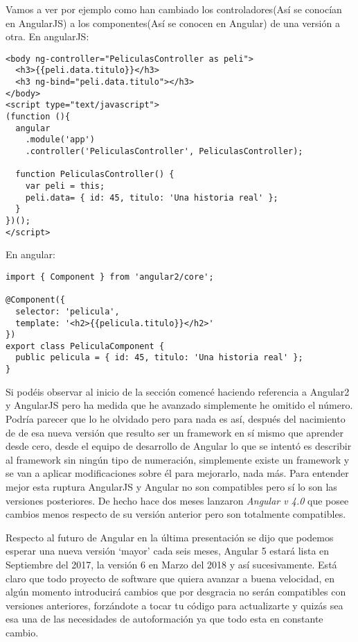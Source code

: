  Vamos a ver por ejemplo como han cambiado los controladores(Así se conocían en AngularJS) a los componentes(Así se conocen en Angular) de una versión a otra.
 En angularJS:
 
 \lstset{breaklines=true, basicstyle=\footnotesize}
\begin{lstlisting}[frame=single]
<body ng-controller="PeliculasController as peli">  
  <h3>{{peli.data.titulo}}</h3>
  <h3 ng-bind="peli.data.titulo"></h3>
</body>  
<script type="text/javascript">  
(function (){
  angular
    .module('app')
    .controller('PeliculasController', PeliculasController);
 
  function PeliculasController() {
    var peli = this;
    peli.data= { id: 45, titulo: 'Una historia real' };
  }
})();
</script> 
\end{lstlisting}

En angular:
 \lstset{breaklines=true, basicstyle=\footnotesize}
\begin{lstlisting}[frame=single]
import { Component } from 'angular2/core';
 
@Component({
  selector: 'pelicula',
  template: '<h2>{{pelicula.titulo}}</h2>'
})
export class PeliculaComponent {  
  public pelicula = { id: 45, titulo: 'Una historia real' };
}
\end{lstlisting}

Si podéis observar al inicio de la sección comencé haciendo referencia a Angular2 y AngularJS pero ha medida que he avanzado simplemente he omitido el número. Podría parecer que lo he olvidado pero para nada es así, después del nacimiento de de esa nueva versión que resulto ser un framework en sí mismo que aprender desde cero, desde el equipo de desarrollo de Angular lo que se intentó es describir al framework sin ningún tipo de numeración, simplemente existe un framework y se van a aplicar modificaciones sobre él para mejorarlo, nada más. Para entender mejor esta ruptura AngularJS y Angular no son compatibles pero sí lo son las versiones posteriores. De hecho hace dos meses lanzaron  \emph{Angular v 4.0 }   que posee cambios menos respecto de su versión anterior pero son totalmente compatibles.




Respecto al futuro de Angular en la última presentación se dijo  que podemos esperar una nueva versión ‘mayor’ cada seis meses, Angular 5 estará lista en Septiembre del 2017, la versión 6 en Marzo del 2018 y así sucesivamente. Está claro que todo proyecto de software que quiera avanzar a buena velocidad, en algún momento introducirá cambios que por desgracia no serán compatibles con versiones anteriores, forzándote a tocar tu código para actualizarte y quizás sea esa una de las necesidades de autoformación ya que todo esta en constante cambio. 

